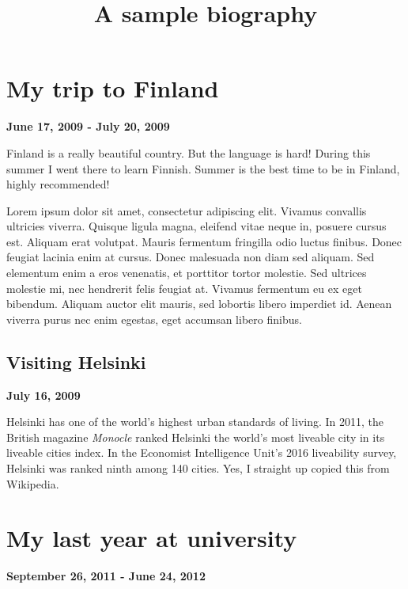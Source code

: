 \documentclass[12pt, a4paper]{article}
\title{A sample biography}
\date{}
\begin{document}
\maketitle
\newpage
\tableofcontents
\newpage

\section{My trip to Finland}
\begin{center}
\textbf{June 17, 2009 - July 20, 2009}
\end{center}
\vspace{3mm}

Finland is a really beautiful country. But the language is hard! During this summer I went there to learn Finnish. Summer is the best time to be in Finland, highly recommended!

Lorem ipsum dolor sit amet, consectetur adipiscing elit. Vivamus convallis ultricies viverra. Quisque ligula magna, eleifend vitae neque in, posuere cursus est. Aliquam erat volutpat. Mauris fermentum fringilla odio luctus finibus. Donec feugiat lacinia enim at cursus. Donec malesuada non diam sed aliquam. Sed elementum enim a eros venenatis, et porttitor tortor molestie. Sed ultrices molestie mi, nec hendrerit felis feugiat at. Vivamus fermentum eu ex eget bibendum. Aliquam auctor elit mauris, sed lobortis libero imperdiet id. Aenean viverra purus nec enim egestas, eget accumsan libero finibus.

\subsection{Visiting Helsinki}
\begin{center}
\textbf{July 16, 2009}
\end{center}
\vspace{3mm}

Helsinki has one of the world's highest urban standards of living. In 2011, the British magazine \textit{Monocle} ranked Helsinki the world's most liveable city in its liveable cities index. In the Economist Intelligence Unit's 2016 liveability survey, Helsinki was ranked ninth among 140 cities. Yes, I straight up copied this from Wikipedia.

\section{My last year at university}
\begin{center}
\textbf{September 26, 2011 - June 24, 2012}
\end{center}
\vspace{3mm}
\end{document}
